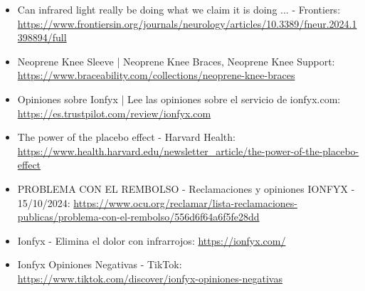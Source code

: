 \documentclass{article}
\begin{document}
\begin{itemize}
    \item Can infrared light really be doing what we claim it is doing ... - Frontiers: {\small\url{https://www.frontiersin.org/journals/neurology/articles/10.3389/fneur.2024.1398894/full}}
    \item Neoprene Knee Sleeve | Neoprene Knee Braces, Neoprene Knee Support: {\small\url{https://www.braceability.com/collections/neoprene-knee-braces}}
    \item Opiniones sobre Ionfyx | Lee las opiniones sobre el servicio de ionfyx.com: {\small\url{https://es.trustpilot.com/review/ionfyx.com}}
    \item The power of the placebo effect - Harvard Health: {\small\url{https://www.health.harvard.edu/newsletter_article/the-power-of-the-placebo-effect}}
    \item PROBLEMA CON EL REMBOLSO - Reclamaciones y opiniones IONFYX - 15/10/2024: {\small\url{https://www.ocu.org/reclamar/lista-reclamaciones-publicas/problema-con-el-rembolso/556d6f64a6f5fe28dd}}
    \item Ionfyx - Elimina el dolor con infrarrojos: {\small\url{https://ionfyx.com/}}
    \item Ionfyx Opiniones Negativas - TikTok: {\small\url{https://www.tiktok.com/discover/ionfyx-opiniones-negativas}}
\end{itemize}
\end{document}
